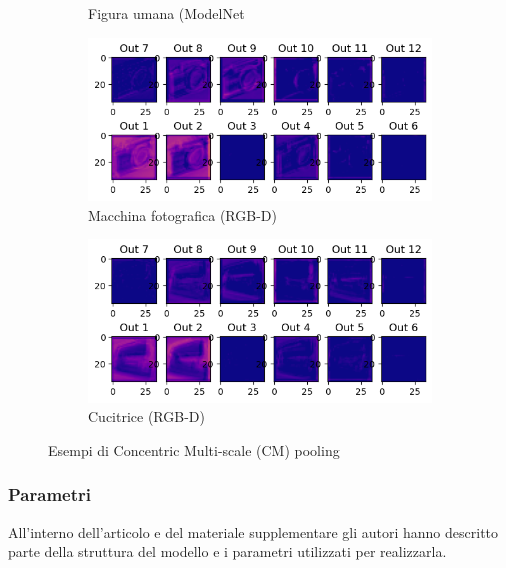\documentclass[italian,12pt,a4paper,oneside,final]{report}
\begin{document}
\begin{figure}[ht]
\begin{subfigure}{0.4\textwidth}
\begin{subcaptionblock}{1.2\textwidth}
			\caption{Figura umana (ModelNet}
			\label{fig:modelnet_M1_out_human}
		\end{subcaptionblock}%
	\end{subfigure}
	\hfill
	\begin{subfigure}{0.4\textwidth}
		\begin{subcaptionblock}{1.2\textwidth}
			\centering
			\includegraphics[width=1.2\linewidth]{rgbd_M1_out_camera.png}
			\caption{Macchina fotografica (RGB-D)}
			\label{fig:rgbd_M1_out_camera}
		\end{subcaptionblock}%
	\end{subfigure}
	\hfill
	\begin{subfigure}{0.4\textwidth}
		\begin{subcaptionblock}{1.2\textwidth}
			\centering
			\includegraphics[width=1.2\linewidth]{rgbd_M1_out_stapler.png}
			\caption{Cucitrice (RGB-D)}
			\label{fig:rgbd_M1_out_stapler}
		\end{subcaptionblock}%
	\end{subfigure}
	\caption{Esempi di Concentric Multi-scale (CM) pooling}
	\label{fig:dataset_cmpooling_samples}
\end{figure}

\newpage
\subsubsection{Parametri}
All'interno dell'articolo\cite{neurips2019:cnn2} e del materiale supplementare\cite{cnn2:supplementary} gli autori hanno descritto parte della struttura del modello e i parametri utilizzati per realizzarla.
\end{document}
